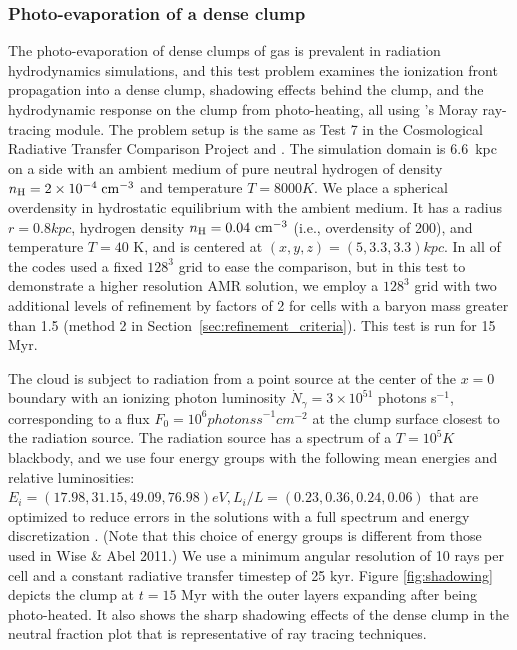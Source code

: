 \subsubsection{Photo-evaporation of a dense clump}
\label{sec.tests.raytracing}

The photo-evaporation of dense clumps of gas is prevalent in radiation
hydrodynamics simulations, and this test problem examines the
ionization front propagation into a dense clump, shadowing effects
behind the clump, and the hydrodynamic response on the clump from
photo-heating, all using \enzo's Moray ray-tracing module.  The
problem setup is the same as Test 7 in the Cosmological Radiative
Transfer Comparison Project \citep{IlievEtAl2009} and
\citet{Wise11_Moray}.  The simulation domain is 6.6~kpc on a side with
an ambient medium of pure neutral hydrogen of density $n_{\rm H} = 2
\times 10^{-4}\; \cubecm$ and temperature $T = 8000 \unit{K}$.  We
place a spherical overdensity in hydrostatic equilibrium with the
ambient medium.  It has a radius $r = 0.8 \unit{kpc}$, hydrogen
density $n_{\rm H} = 0.04\ \cubecm$ (i.e., overdensity of 200), and
temperature $T = 40$ K, and is centered at $(x,y,z) = (5, 3.3, 3.3)
\unit{kpc}$.  In \citet{IlievEtAl2009} all of the codes used a fixed
$128^3$ grid to ease the comparison, but in this test to demonstrate a
higher resolution AMR solution, we employ a $128^3$ grid with two
additional levels of refinement by factors of 2 for cells with a
baryon mass greater than 1.5 (method 2 in
Section~\ref{sec:refinement_criteria}). This test is run for 15 Myr.

The cloud is subject to radiation from a point source at the center of
the $x=0$ boundary with an ionizing photon luminosity $\dot{N}_\gamma
= 3 \times 10^{51}$ photons s$^{-1}$, corresponding to a flux $F_0 =
10^6 \unit{photons s}^{-1} \unit{cm}^{-2}$ at the clump surface
closest to the radiation source.  The radiation source has a spectrum
of a $T = 10^5 \unit{K}$ blackbody, and we use four energy groups with
the following mean energies and relative luminosities: $E_i = (17.98,
31.15, 49.09, 76.98) \unit{eV}, L_i/L = (0.23, 0.36, 0.24, 0.06)$ that
are optimized to reduce errors in the solutions with a full spectrum
and energy discretization \citep{Mirocha12}.  (Note that this choice
of energy groups is different from those used in Wise \& Abel 2011.)
\nocite{Wise11_Moray} We use a minimum angular resolution of 10 rays
per cell and a constant radiative transfer timestep of 25 kyr.  Figure
\ref{fig:shadowing} depicts the clump at $t = 15$ Myr with the outer
layers expanding after being photo-heated.  It also shows the sharp
shadowing effects of the dense clump in the neutral fraction plot that
is representative of ray tracing techniques.

